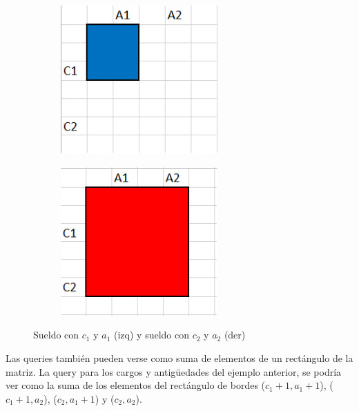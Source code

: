 \begin{figure}[H]
 
\begin{subfigure}{0.5\textwidth}
    \centering
\includegraphics[width=6cm]{Imagenes/Ej3b.png} 
\label{fig:subim1}
\end{subfigure}
\begin{subfigure}{0.5\textwidth}
    \centering
\includegraphics[width=6cm]{Imagenes/Ej3c.png}
\label{fig:subim2}
\end{subfigure}
 
\caption{Sueldo con $c_1$ y $a_1$ (izq) y sueldo con $c_2$ y $a_2$ (der)}
\label{fig:image2}
\end{figure}



Las queries también pueden verse como suma de elementos de un rectángulo de la matriz. La query para los cargos y antigüedades del ejemplo anterior, se podría ver como la suma de los elementos del rectángulo de bordes ($c_1+1,a_1+1$), ($c_1+1,a_2$), ($c_2,a_1+1$) y ($c_2,a_2$).

